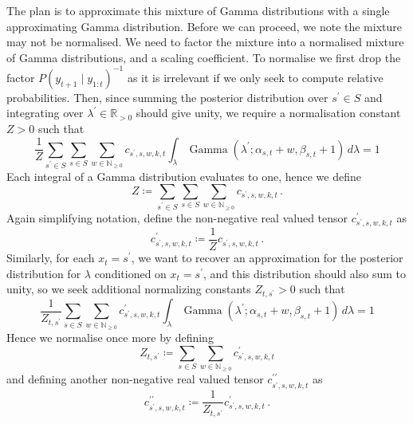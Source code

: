 \documentclass[twoside, 11pt]{article}
\DeclareMathOperator*{\gammad}{Gamma}
\newcommand{\reals}[0] {\mathbb{R}}
\newcommand{\nonnegint}[0] {\mathbb{N}_{\geq 0}}
\begin{document}
The plan is to approximate this mixture of Gamma distributions with a single approximating Gamma distribution. Before we can proceed, we note the mixture may not be normalised. We need to factor the mixture into a normalised mixture of Gamma distributions, and a scaling coefficient. To normalise we first drop the factor $P(y_{t+1} \mid y_{1:t})^{-1}$ as it is irrelevant if we only seek to compute relative probabilities. Then, since summing the posterior distribution over $s^{\prime} \in S$ and integrating over $\lambda^{\prime} \in \reals_{>0}$ should give unity, we require a normalisation constant $Z > 0$ such that
\begin{equation}
\frac{1}{Z}
\sum_{s^{\prime} \in S}
\sum_{s \in S}
\sum_{w \in \nonnegint}
c_{s^{\prime}, s, w, k, t}
\int_{\lambda}
\gammad(\lambda^{\prime} ; \alpha_{s,t} + w, \beta_{s,t} + 1)
\,d\lambda = 1 \nonumber
\end{equation}
Each integral of a Gamma distribution evaluates to one, hence we define
\begin{equation}
Z \coloneqq 
\sum_{s^{\prime} \in S}
\sum_{s \in S}
\sum_{w \in \nonnegint}
c_{s^{\prime}, s, w, k, t} \, .
\end{equation}
Again simplifying notation, define the non-negative real valued tensor $c^{\prime}_{s^{\prime}, s, w, k, t}$ as
\begin{equation}
c^{\prime}_{s^{\prime}, s, w, k, t} \coloneqq \frac{1}{Z}
c_{s^{\prime}, s, w, k, t} \, .
\end{equation}
Similarly, for each $x_t=s^{\prime}$, we want to recover an approximation for the posterior distribution for $\lambda$ conditioned on $x_{t}=s^{\prime}$, and this distribution should also sum to unity, so we seek additional normalizing constants $Z_{t,s^{\prime}} > 0$ such that
\begin{equation}
\frac{1}{Z_{t,s^{\prime}}}
\sum_{s \in S}
\sum_{w \in \nonnegint}
c^{\prime}_{s^{\prime}, s, w, k, t}
\int_{\lambda}
\gammad(\lambda^{\prime} ; \alpha_{s,t} + w, \beta_{s,t} + 1)
\,d\lambda = 1 \nonumber
\end{equation}
Hence we normalise once more by defining
\begin{equation}
Z_{t,s^{\prime}}
\coloneqq
\sum_{s \in S}
\sum_{w \in \nonnegint}
c^{\prime}_{s^{\prime}, s, w, k, t}
\end{equation}
and defining another non-negative real valued tensor $c^{\prime\prime}_{s^{\prime}, s, w, k, t}$ as
\begin{equation}
c^{\prime\prime}_{s^{\prime}, s, w, k, t} \coloneqq \frac{1}{Z_{t, s^{\prime}}}
c^{\prime}_{s^{\prime}, s, w, k, t} \, .
\end{equation}
\end{document}
